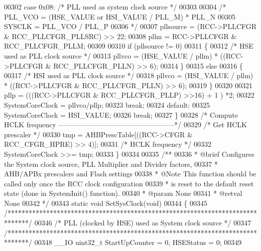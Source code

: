 \begin{DoxyCode}
00302     \textcolor{keywordflow}{case} 0x08:  \textcolor{comment}{/* PLL used as system clock source */}
00303 
00304       \textcolor{comment}{/* PLL\_VCO = (HSE\_VALUE or HSI\_VALUE / PLL\_M) * PLL\_N}
00305 \textcolor{comment}{         SYSCLK = PLL\_VCO / PLL\_P}
00306 \textcolor{comment}{         */}
00307       pllsource = (RCC->PLLCFGR & RCC_PLLCFGR_PLLSRC) >> 22;
00308       pllm = RCC->PLLCFGR & RCC_PLLCFGR_PLLM;
00309 
00310       \textcolor{keywordflow}{if} (pllsource != 0)
00311       \{
00312         \textcolor{comment}{/* HSE used as PLL clock source */}
00313         pllvco = (HSE_VALUE / pllm) * ((RCC->PLLCFGR & RCC_PLLCFGR_PLLN) >> 6);
00314       \}
00315       \textcolor{keywordflow}{else}
00316       \{
00317         \textcolor{comment}{/* HSI used as PLL clock source */}
00318         pllvco = (HSI_VALUE / pllm) * ((RCC->PLLCFGR & RCC_PLLCFGR_PLLN) >> 6);
00319       \}
00320 
00321       pllp = (((RCC->PLLCFGR & RCC_PLLCFGR_PLLP) >>16) + 1 ) *2;
00322       SystemCoreClock = pllvco/pllp;
00323       \textcolor{keywordflow}{break};
00324     \textcolor{keywordflow}{default}:
00325       SystemCoreClock = HSI_VALUE;
00326       \textcolor{keywordflow}{break};
00327   \}
00328   \textcolor{comment}{/* Compute HCLK frequency --------------------------------------------------*/}
00329   \textcolor{comment}{/* Get HCLK prescaler */}
00330   tmp = AHBPrescTable[((RCC->CFGR & RCC_CFGR_HPRE) >> 4)];
00331   \textcolor{comment}{/* HCLK frequency */}
00332   SystemCoreClock >>= tmp;
00333 \}
00334 
00335 \textcolor{comment}{/**}
00336 \textcolor{comment}{  * @brief  Configures the System clock source, PLL Multiplier and Divider factors, }
00337 \textcolor{comment}{  *         AHB/APBx prescalers and Flash settings}
00338 \textcolor{comment}{  * @Note   This function should be called only once the RCC clock configuration  }
00339 \textcolor{comment}{  *         is reset to the default reset state (done in SystemInit() function).   }
00340 \textcolor{comment}{  * @param  None}
00341 \textcolor{comment}{  * @retval None}
00342 \textcolor{comment}{  */}
00343 \textcolor{keyword}{static} \textcolor{keywordtype}{void} SetSysClock(\textcolor{keywordtype}{void})
00344 \{
00345 \textcolor{comment}{/******************************************************************************/}
00346 \textcolor{comment}{/*            PLL (clocked by HSE) used as System clock source                */}
00347 \textcolor{comment}{/******************************************************************************/}
00348   \_\_IO uint32\_t StartUpCounter = 0, HSEStatus = 0;
00349 

\end{DoxyCode}
